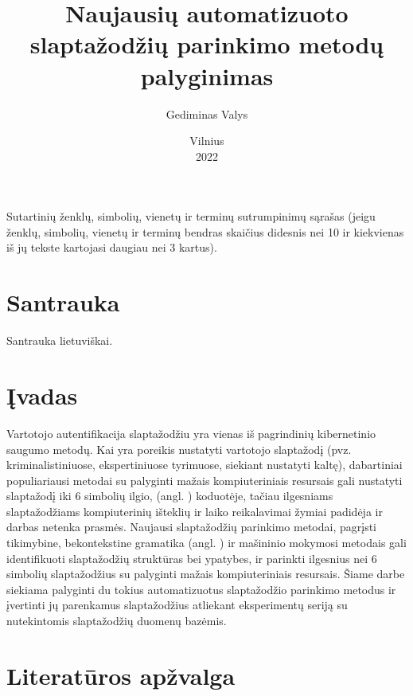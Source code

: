 \documentclass{VUMIFInfBakalaurinis}
\institute{Informatikos institutas}
\title{Naujausių automatizuoto slaptažodžių parinkimo metodų palyginimas}
\author{Gediminas Valys}
\date{Vilnius \\ 2022}
\begin{document}
\maketitle

\tableofcontents

Sutartinių ženklų, simbolių, vienetų ir terminų sutrumpinimų sąrašas (jeigu
ženklų, simbolių, vienetų ir terminų bendras skaičius didesnis nei 10 ir
kiekvienas iš jų tekste kartojasi daugiau nei 3 kartus).

\section{Santrauka}
Santrauka lietuviškai.

\section{Įvadas}
Vartotojo autentifikacija slaptažodžiu yra vienas iš pagrindinių kibernetinio 
saugumo metodų. Kai yra poreikis nustatyti vartotojo slaptažodį (pvz. 
kriminalistiniuose, ekspertiniuose tyrimuose, siekiant nustatyti kaltę), 
dabartiniai populiariausi metodai su palyginti mažais kompiuteriniais resursais 
gali nustatyti slaptažodį iki 6 simbolių ilgio,  (angl. 
) koduotėje, 
tačiau ilgesniams slaptažodžiams kompiuterinių išteklių ir laiko reikalavimai 
žymiai padidėja ir darbas netenka prasmės. Naujausi slaptažodžių parinkimo 
metodai, pagrįsti tikimybine, bekontekstine gramatika (angl. 
) ir mašininio mokymosi metodais 
gali identifikuoti slaptažodžių struktūras bei ypatybes, ir parinkti ilgesnius 
nei 6 simbolių slaptažodžius su palyginti mažais kompiuteriniais resursais. 
Šiame darbe siekiama palyginti du tokius automatizuotus slaptažodžio parinkimo 
metodus ir įvertinti jų parenkamus slaptažodžius atliekant eksperimentų seriją 
su nutekintomis slaptažodžių duomenų bazėmis.

\section{Literatūros apžvalga}
\end{document}
